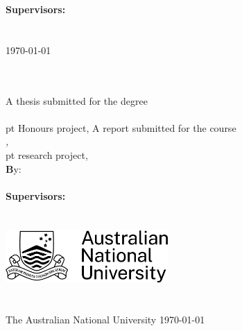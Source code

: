 \noindent
{\footnotesize \bfseries Supervisor\ifTwoSupervisors{}s\fi:}\\
{\footnotesize \FirstSupervisor%
\ifTwoSupervisors\\\SecondSupervisor\fi}\\[2 em]
\vfill
{\footnotesize \monthyeardate\today}



\else %


\begin{center}
\ \\[0.5em]
{\bfseries \Huge \ProjectTitle}\\[3.75em]
%
\ifHonoursThesis%
\Large{A thesis submitted for the degree}\\
\Large{\emph{\Degree}}\\[.2em]
{\ProjectPoints{} pt Honours project, \Semester{} \Year}
\else%
\Large{A report submitted for the course}\\
\Large{\emph{\CourseCode, \CourseName}}\\[.em]
{\ProjectPoints{} pt research project, \Semester{} \Year}
\fi
%
\ \\[3.75em]
{\footnotesize \textbf By:}\\
\textbf{\AuthorName}\\[2.75em]
%
{\bfseries Supervisor\ifTwoSupervisors{}s\fi:}\\
{\FirstSupervisor%
\ifTwoSupervisors\\\SecondSupervisor\fi}\\[5em]
%
\includegraphics[height=2.0cm]{figures/ANU-logos/ANU_Primary_Horizontal_Black.jpg}\ \\[1.9em]
%
{\bfseries \School}\\
{\mdseries \College}\\
The Australian National University
%
\vfill
\normalsize{\monthyeardate\today}
\end{center}



\fi


\restoregeometry
